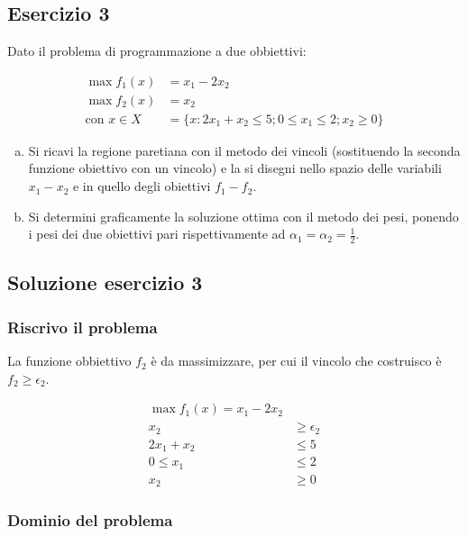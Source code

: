 \documentclass[\main/main.tex]{subfiles}
\begin{document}
\subsection{Esercizio 3}
Dato il problema di programmazione a due obbiettivi:

\begin{align*}
  \max f_1(x)          & = x_1 - 2x_2                                          \\
  \max f_2 (x)         & = x_2                                                 \\
  \text {con } x \in X & = \{x:2x_1+x_2\leq 5; 0 \leq x_1 \leq 2; x_2 \geq 0\}
\end{align*}

\begin{enumerate}[a)]
  \item Si ricavi la regione paretiana con il metodo dei vincoli (sostituendo la seconda funzione obiettivo con un vincolo) e la si disegni nello spazio delle variabili $x_1 - x_2$ e in quello degli obiettivi $f_1 - f_2$.
  \item Si determini graficamente la soluzione ottima con il metodo dei pesi, ponendo i pesi dei due obiettivi pari rispettivamente ad $\alpha_1 = \alpha_2 = \frac{1}{2}$.
\end{enumerate}

\subsection{Soluzione esercizio 3}
\subsubsection*{Riscrivo il problema}
La funzione obbiettivo $f_2$ è da massimizzare, per cui il vincolo che costruisco è $f_2 \geq \epsilon_2$.

\begin{align*}
  \max f_1(x)          = x_1 - 2x_2 \\
  x_2        & \geq \epsilon_2      \\
  2x_1+x_2   & \leq 5               \\
  0 \leq x_1 & \leq 2               \\
  x_2        & \geq 0
\end{align*}

\subsubsection*{Dominio del problema}
\end{document}
